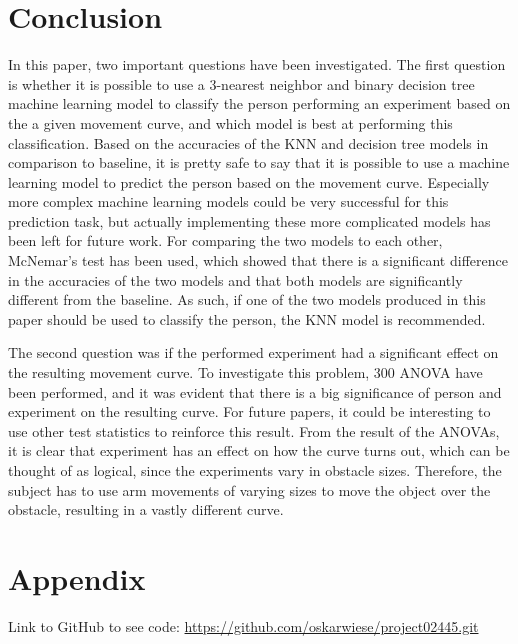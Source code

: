 \documentclass[11pt, fleqn, titlepage]{article}
\begin{document}
\section{Conclusion} \vspace*{-0.1cm}
In this paper, two important questions have been investigated. The first question is whether it is possible to use a 3-nearest neighbor and binary decision tree machine learning model to classify the person performing an experiment based on the a given movement curve, and which model is best at performing this classification. Based on the accuracies of the KNN and decision tree models in comparison to baseline, it is pretty safe to say that it is possible to use a machine learning model to predict the person based on the movement curve. Especially more complex machine learning models could be very successful for this prediction task, but actually implementing these more complicated models has been left for future work. For comparing the two models to each other, McNemar's test has been used, which showed that there is a significant difference in the accuracies of the two models and that both models are significantly different from the baseline. As such, if one of the two models produced in this paper should be used to classify the person, the KNN model is recommended.

The second question was if the performed experiment had a significant effect on the resulting movement curve. To investigate this problem, 300 ANOVA have been performed, and it was evident that there is a big significance of person and experiment on the resulting curve. For future papers, it could be interesting to use other test statistics to reinforce this result. From the result of the ANOVAs, it is clear that experiment has an effect on how the curve turns out, which can be thought of as logical, since the experiments vary in obstacle sizes. Therefore, the subject has to use arm movements of varying sizes to move the object over the obstacle, resulting in a vastly different curve.
\newpage
\section{Appendix}
Link to GitHub to see code:
\url{https://github.com/oskarwiese/project02445.git}
	


\end{document}
